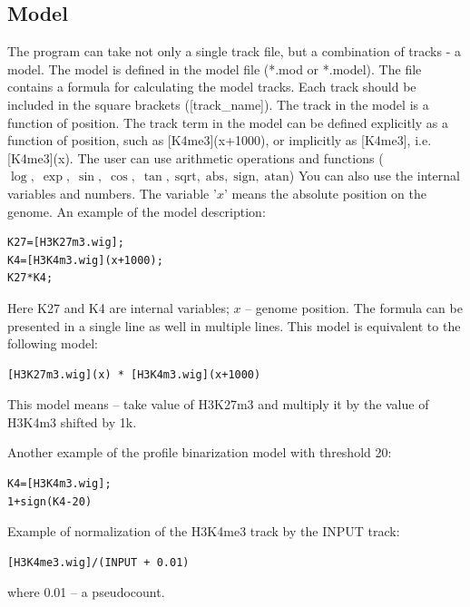 \documentclass{article}
\newcommand{\tw}{\textwidth}
\begin{document}
\subsection{Model}\label{model}
The program can take not only a single track file, but a combination of tracks - a model.  The model is defined in the model file (*.mod or *.model). The file contains a formula for calculating the model tracks. Each track should be included in the square brackets ([track\_name]).  The track in the model is a function of position. The track term in the model can be defined explicitly as a function of position, such as [K4me3](x+1000), or implicitly as [K4me3], i.e. [K4me3](x). The user can use arithmetic operations and functions 
($\log ,\;\exp ,\;\sin ,\;\cos	,\;\tan  ,\;\text{sqrt} ,\;\text{abs}  ,\;\text{sign} ,\;\text{atan}$)
You can also use the internal variables and numbers. The variable '$x$' means the absolute position on the genome. An example of the model description:
\begin{center}
\begin{minipage}{0.5\tw}
\begin{verbatim}
K27=[H3K27m3.wig];
K4=[H3K4m3.wig](x+1000);
K27*K4;
\end{verbatim}
\end{minipage}
\end{center}
Here K27 and K4 are internal variables; $x$ -- genome position. The formula can be presented in a single line as well in multiple lines. This model is equivalent to the following model:
\begin{center}
\begin{minipage}{0.5\tw}
\begin{verbatim}
[H3K27m3.wig](x) * [H3K4m3.wig](x+1000)
\end{verbatim}
\end{minipage}
\end{center}
This model means -- take value of H3K27m3 and multiply it by the value of H3K4m3 shifted by 1k.

Another example of the profile binarization model with threshold 20:
\begin{center}
\begin{minipage}{0.5\tw}
\begin{verbatim}
K4=[H3K4m3.wig];
1+sign(K4-20)
\end{verbatim}
\end{minipage}
\end{center}

Example of normalization of the H3K4me3 track by the INPUT track:
\begin{center}
\begin{minipage}{0.5\tw}
\begin{verbatim}
[H3K4me3.wig]/(INPUT + 0.01)
\end{verbatim}
\end{minipage}
\end{center}
where 0.01 -- a pseudocount.
\end{document}
